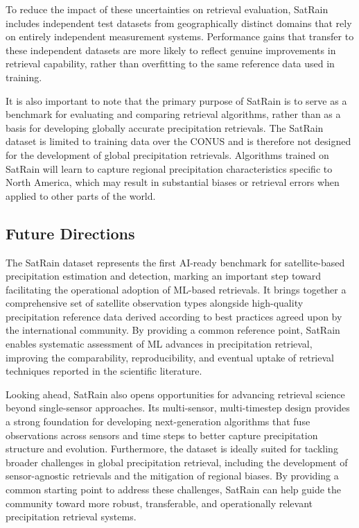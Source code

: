 \documentclass[11pt]{article}
\begin{document}
To reduce the impact of these uncertainties on retrieval evaluation, SatRain
includes independent test datasets from geographically distinct domains that
rely on entirely independent measurement systems. Performance gains that
transfer to these independent datasets are more likely to reflect genuine
improvements in retrieval capability, rather than overfitting to the same
reference data used in training.

It is also important to note that the primary purpose of SatRain is to serve as
a benchmark for evaluating and comparing retrieval algorithms, rather than as a
basis for developing globally accurate precipitation retrievals. The SatRain
dataset is limited to training data over the CONUS and is therefore not designed
for the development of global precipitation retrievals. Algorithms trained on
SatRain will learn to capture regional precipitation characteristics specific to
North America, which may result in substantial biases or retrieval errors when
applied to other parts of the world.

\subsection{Future Directions}

The SatRain dataset represents the first AI-ready benchmark for satellite-based
precipitation estimation and detection, marking an important step toward
facilitating the operational adoption of ML-based retrievals. It
brings together a comprehensive set of satellite observation types alongside
high-quality precipitation reference data derived according to best practices
agreed upon by the international community. By providing a common reference
point, SatRain enables systematic assessment of ML advances in
precipitation retrieval, improving the comparability, reproducibility, and
eventual uptake of retrieval techniques reported in the scientific literature.

Looking ahead, SatRain also opens opportunities for advancing retrieval science
beyond single-sensor approaches. Its multi-sensor, multi-timestep design
provides a strong foundation for developing next-generation algorithms that fuse
observations across sensors and time steps to better capture precipitation
structure and evolution. Furthermore, the dataset is ideally suited for tackling
broader challenges in global precipitation retrieval, including the development
of sensor-agnostic retrievals and the mitigation of regional biases. By
providing a common starting point to address these challenges, SatRain can help
guide the community toward more robust, transferable, and operationally relevant
precipitation retrieval systems.




\end{document}
